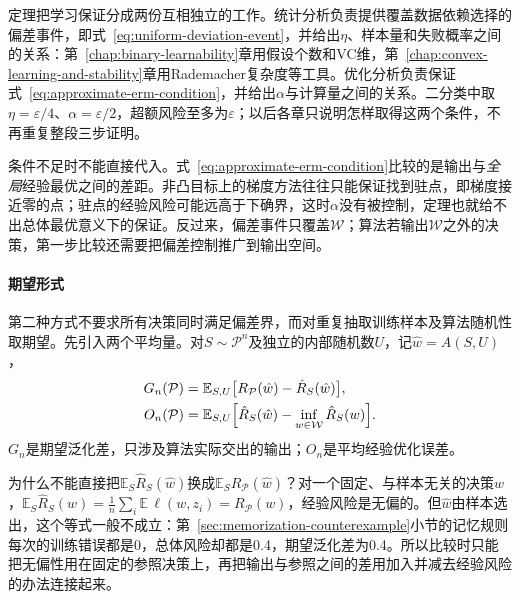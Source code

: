 定理把学习保证分成两份互相独立的工作。统计分析负责提供覆盖数据依赖选择的偏差事件，即式~\eqref{eq:uniform-deviation-event}，并给出$\eta$、样本量和失败概率之间的关系：第~\ref{chap:binary-learnability}章用假设个数和VC维，第~\ref{chap:convex-learning-and-stability}章用Rademacher复杂度等工具。优化分析负责保证式~\eqref{eq:approximate-erm-condition}，并给出$\alpha$与计算量之间的关系。二分类中取$\eta=\varepsilon/4$、$\alpha=\varepsilon/2$，超额风险至多为$\varepsilon$；以后各章只说明怎样取得这两个条件，不再重复整段三步证明。

条件不足时不能直接代入。式~\eqref{eq:approximate-erm-condition}比较的是输出与\emph{全局}经验最优之间的差距。非凸目标上的梯度方法往往只能保证找到驻点，即梯度接近零的点；驻点的经验风险可能远高于下确界，这时$\alpha$没有被控制，定理也就给不出总体最优意义下的保证。反过来，偏差事件只覆盖$\mathcal W$；算法若输出$\mathcal W$之外的决策，第一步比较还需要把偏差控制推广到输出空间。

\paragraph{期望形式}
第二种方式不要求所有决策同时满足偏差界，而对重复抽取训练样本及算法随机性取期望。先引入两个平均量。对$S\sim\mathcal P^n$及独立的内部随机数$U$，记$\hat w=A(S,U)$，
\begin{align}
 G_n(\mathcal P)
 &=\mathbb E_{S,U}\bigl[R_{\mathcal P}(\hat w)-\hat R_S(\hat w)\bigr],
 \label{eq:expected-generalization-gap}\\
 O_n(\mathcal P)
 &=\mathbb E_{S,U}\Bigl[\hat R_S(\hat w)-\inf_{w\in\mathcal W}\hat R_S(w)\Bigr].
 \label{eq:expected-optimization-error}
\end{align}
$G_n$是期望泛化差，只涉及算法实际交出的输出；$O_n$是平均经验优化误差。

为什么不能直接把$\mathbb E_S\hat R_S(\hat w)$换成$\mathbb E_SR_{\mathcal P}(\hat w)$？对一个固定、与样本无关的决策$w$，$\mathbb E_S\hat R_S(w)=\frac1n\sum_i\mathbb E\,\ell(w,z_i)=R_{\mathcal P}(w)$，经验风险是无偏的。但$\hat w$由样本选出，这个等式一般不成立：第~\ref{sec:memorization-counterexample}小节的记忆规则每次的训练错误都是0，总体风险却都是0.4，期望泛化差为0.4。所以比较时只能把无偏性用在固定的参照决策上，再把输出与参照之间的差用加入并减去经验风险的办法连接起来。

